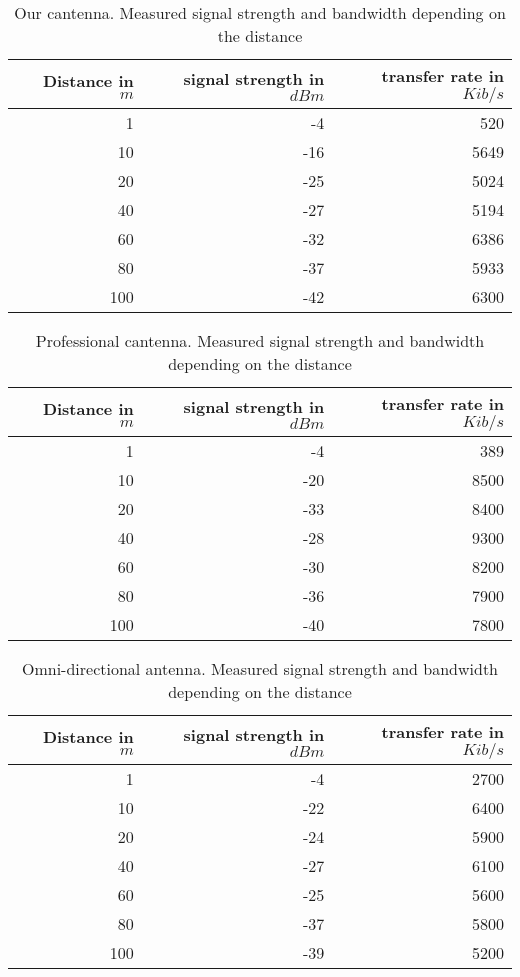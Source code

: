 
\begin{table}
	\begin{center}
		\begin{tabular}{r|r|r}\
		 Distance in $m$ & signal strength in $dBm$ & transfer rate in $Kib/s$\\
		 \hline 
		 1 & -4 & 520\\
		 10 & -16 & 5649\\
		 20 & -25 & 5024\\
		 40 & -27 & 5194\\
		 60 & -32 & 6386\\
		 80 & -37 & 5933\\
		 100 & -42 & 6300\\
		\end{tabular}
	\end{center}
	\caption{Our cantenna. Measured signal strength and bandwidth depending on the distance}
	\label{dist:can}
\end{table}

\begin{table}
	\begin{center}
		\begin{tabular}{r|r|r}\
			Distance in $m$ & signal strength in $dBm$ & transfer rate in $Kib/s$\\
			\hline 
			1 & -4 & 389\\
			10 & -20 & 8500\\
			20 & -33 & 8400\\
			40 & -28 & 9300\\
			60 & -30 & 8200\\
			80 & -36 & 7900\\
			100 & -40 & 7800\\
		\end{tabular}
	\end{center}
	\caption{Professional cantenna. Measured signal strength and bandwidth depending on the distance}
	\label{dist:prof}
\end{table}

\begin{table}
	\begin{center}
		\begin{tabular}{r|r|r}\
			Distance in $m$ & signal strength in $dBm$ & transfer rate in $Kib/s$\\
			\hline 
			1 & -4 & 2700\\
			10 & -22 & 6400\\
			20 & -24 & 5900\\
			40 & -27 & 6100\\
			60 & -25 & 5600\\
			80 & -37 & 5800\\
			100 & -39 & 5200\\
		\end{tabular}
	\end{center}
	\caption{Omni-directional antenna. Measured signal strength and bandwidth depending on the distance}
	\label{dist:omnio}
\end{table}



